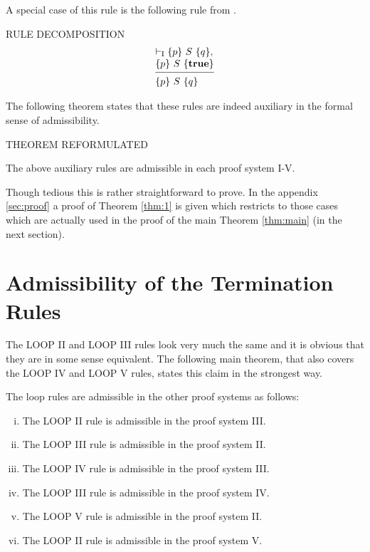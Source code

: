 \documentclass[runningheads]{llncs}       %
\begin{document}
A special case of this rule is the following rule from \cite{ABO09}.
\III

\noindent
RULE DECOMPOSITION
\[
 \begin{array}{l}
  \vdash_{\rm{I}} \HT{p}{S}{q},      \\
  \HT{p}{S}{\T}                      \\
  [-\medskipamount]
  \hrulefill                         \\
  \HT{p}{S}{q}
  \end{array}
\]

The following theorem states that these rules are indeed auxiliary
in the formal sense of admissibility.

THEOREM REFORMULATED

\begin{theorem}\label{thm:aux}
The above auxiliary rules 
are admissible in each proof system I-V.
\end{theorem}

Though tedious this is rather straightforward to prove.
In the appendix \ref{sec:proof} a proof of Theorem \ref{thm:1}  is given which restricts to
those cases
which are actually used in the proof
of the main Theorem \ref{thm:main} (in the next section).

\section{Admissibility of the Termination Rules}

The LOOP II and LOOP III rules look very much the same and it is obvious that
they are in some sense equivalent. 
The following main theorem, that also covers the LOOP IV and LOOP V rules,
states this claim in the strongest way.


\begin{theorem} \label{thm:main}
The loop rules are admissible in the other proof systems as follows:

  \begin{enumerate} [(i)]
   \item The LOOP II rule is admissible in the proof system III.

   \item The LOOP III rule is admissible in the proof system II.

   \item The LOOP IV rule is admissible in the proof system III.

   \item The LOOP III rule is admissible in the proof system IV.

   \item The LOOP V rule is admissible in the proof system II.

   \item The LOOP II rule is admissible in the proof system V.

  \end{enumerate}

\end{theorem}
\end{document}

